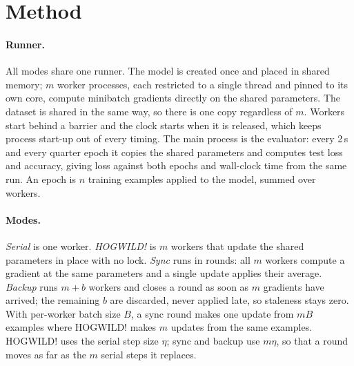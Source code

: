 \documentclass[11pt]{article}
\begin{document}

\section{Method}  %

\paragraph{Runner.}
All modes share one runner. The model is created once and placed in shared
memory; $m$ worker processes, each restricted to a single thread and pinned to
its own core, compute minibatch gradients directly on the shared parameters.
The dataset is shared in the same way, so there is one copy regardless of $m$.
Workers start behind a barrier and the clock starts when it is released, which
keeps process start-up out of every timing. The main process is the
evaluator: every 2\,s and every quarter epoch it copies the shared parameters
and computes test loss and accuracy, giving loss against both epochs and
wall-clock time from the same run. An epoch is $n$ training examples applied
to the model, summed over workers.

\paragraph{Modes.}
\emph{Serial} is one worker. \emph{HOGWILD!} is $m$ workers that update the
shared parameters in place with no lock. \emph{Sync} runs in rounds: all $m$
workers compute a gradient at the same parameters and a single update applies
their average. \emph{Backup} runs $m+b$ workers and closes a round as soon as
$m$ gradients have arrived; the remaining $b$ are discarded, never applied
late, so staleness stays zero. With per-worker batch size $B$, a sync round
makes one update from $mB$ examples where HOGWILD! makes $m$ updates from the
same examples. HOGWILD! uses the serial step size $\eta$; sync and backup
use $m\eta$, so that a round moves as far as the $m$ serial steps it replaces.
\end{document}
